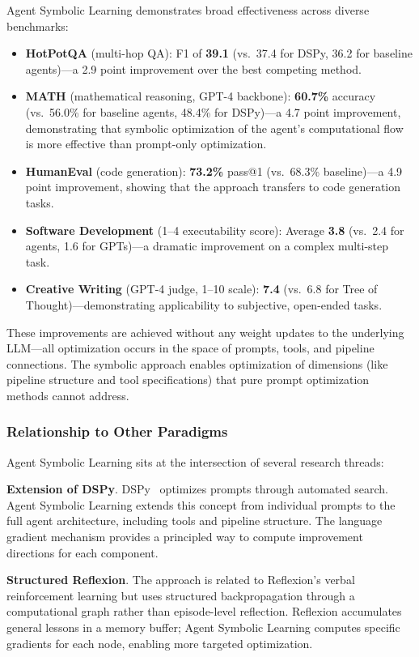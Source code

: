 Agent Symbolic Learning demonstrates broad effectiveness across diverse benchmarks:

\begin{itemize}
\item \textbf{HotPotQA} (multi-hop QA): F1 of \textbf{39.1} (vs.\ 37.4 for DSPy, 36.2 for baseline agents)---a 2.9 point improvement over the best competing method.
\item \textbf{MATH} (mathematical reasoning, GPT-4 backbone): \textbf{60.7\%} accuracy (vs.\ 56.0\% for baseline agents, 48.4\% for DSPy)---a 4.7 point improvement, demonstrating that symbolic optimization of the agent's computational flow is more effective than prompt-only optimization.
\item \textbf{HumanEval} (code generation): \textbf{73.2\%} pass@1 (vs.\ 68.3\% baseline)---a 4.9 point improvement, showing that the approach transfers to code generation tasks.
\item \textbf{Software Development} (1--4 executability score): Average \textbf{3.8} (vs.\ 2.4 for agents, 1.6 for GPTs)---a dramatic improvement on a complex multi-step task.
\item \textbf{Creative Writing} (GPT-4 judge, 1--10 scale): \textbf{7.4} (vs.\ 6.8 for Tree of Thought)---demonstrating applicability to subjective, open-ended tasks.
\end{itemize}

These improvements are achieved without any weight updates to the underlying LLM---all optimization occurs in the space of prompts, tools, and pipeline connections. The symbolic approach enables optimization of dimensions (like pipeline structure and tool specifications) that pure prompt optimization methods cannot address.

\subsubsection{Relationship to Other Paradigms}

Agent Symbolic Learning sits at the intersection of several research threads:

\textbf{Extension of DSPy}. DSPy~\citep{khattab2024dspy} optimizes prompts through automated search. Agent Symbolic Learning extends this concept from individual prompts to the full agent architecture, including tools and pipeline structure. The language gradient mechanism provides a principled way to compute improvement directions for each component.

\textbf{Structured Reflexion}. The approach is related to Reflexion's verbal reinforcement learning but uses structured backpropagation through a computational graph rather than episode-level reflection. Reflexion accumulates general lessons in a memory buffer; Agent Symbolic Learning computes specific gradients for each node, enabling more targeted optimization.

